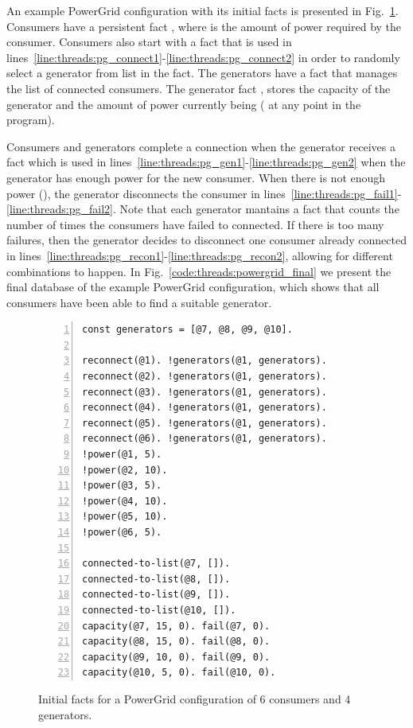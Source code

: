 An example PowerGrid configuration with its initial facts is presented in
Fig.~\ref{code:threads:powergrid_init}. Consumers have a persistent fact
, where  is the amount of power required by the
consumer. Consumers also start with a
 fact that is used in
lines~\ref{line:threads:pg_connect1}-\ref{line:threads:pg_connect2} in order to
randomly select a generator from list  in the 
fact. The generators have a  fact that manages the
list of connected consumers. The generator fact ,
stores the  capacity of the generator and the amount of power
currently being  ( at any point in the program).

Consumers and generators complete a connection when the generator receives a
 fact which is used in
lines~\ref{line:threads:pg_gen1}-\ref{line:threads:pg_gen2} when the generator
has enough power for the new consumer. When there is not enough power
(), the generator disconnects the consumer in
lines~\ref{line:threads:pg_fail1}-\ref{line:threads:pg_fail2}. Note that each
generator mantains a  fact that counts the number of times the
consumers have failed to connected. If there is too many failures, then the
generator decides to disconnect one consumer already connected in
lines~\ref{line:threads:pg_recon1}-\ref{line:threads:pg_recon2}, allowing for
different combinations to happen. In Fig.~\ref{code:threads:powergrid_final} we
present the final database of the example PowerGrid configuration, which shows
that all consumers have been able to find a suitable generator.

\begin{figure}[h!]
\begin{Verbatim}[numbers=left,fontsize=\codesize,commandchars=*\#\&]
const generators = [@7, @8, @9, @10].

reconnect(@1). !generators(@1, generators).
reconnect(@2). !generators(@1, generators).
reconnect(@3). !generators(@1, generators).
reconnect(@4). !generators(@1, generators).
reconnect(@5). !generators(@1, generators).
reconnect(@6). !generators(@1, generators).
!power(@1, 5).
!power(@2, 10).
!power(@3, 5).
!power(@4, 10).
!power(@5, 10).
!power(@6, 5).

connected-to-list(@7, []).
connected-to-list(@8, []).
connected-to-list(@9, []).
connected-to-list(@10, []).
capacity(@7, 15, 0). fail(@7, 0).
capacity(@8, 15, 0). fail(@8, 0).
capacity(@9, 10, 0). fail(@9, 0).
capacity(@10, 5, 0). fail(@10, 0).
\end{Verbatim}
\caption{Initial facts for a PowerGrid configuration of 6 consumers and 4 generators.}
\label{code:threads:powergrid_init}
\end{figure}

